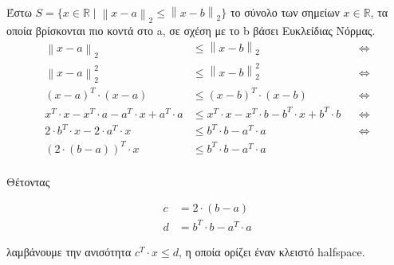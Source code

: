 \documentclass[12pt]{article}
\newcommand{\R}{\mathbb{R}}
\newcommand{\norm}[1]{\left\lVert#1\right\rVert}
\begin{document}
Έστω $S = \lbrace x \in \R \mid \norm{x - a}_2 \leq \norm{x - b}_2 \rbrace$ το σύνολο
των σημείων $x \in \R$, τα οποία βρίσκονται πιο κοντά στο a, σε σχέση με το b
βάσει Ευκλείδιας Νόρμας.\\

\begin{align*}
    \norm{x - a}_2 & \leq \norm{x - b}_2 && \Leftrightarrow \\
    \norm{x - a}_2^2 & \leq \norm{x - b}_2^2 && \Leftrightarrow \\
    (x - a)^T \cdot (x - a) & \leq (x - b)^T \cdot (x - b) && \Leftrightarrow \\
    x^T \cdot x - x^T \cdot a - a^T \cdot x + a^T \cdot a & \leq x^T \cdot x - x^T \cdot b - b^T \cdot x + b^T \cdot b && \Leftrightarrow \\
    2 \cdot b^T \cdot x - 2 \cdot a^T \cdot x & \leq b^T \cdot b - a^T \cdot a && \Leftrightarrow \\
    (2 \cdot (b - a))^T \cdot x & \leq b^T \cdot b - a^T \cdot a
\end{align*}\\

Θέτοντας

\begin{align*}
    c & = 2 \cdot (b - a) \\
    d & = b^T \cdot b - a^T \cdot a
\end{align*}

λαμβάνουμε την ανισότητα $c^T \cdot x \leq d$, η οποία ορίζει έναν κλειστό halfspace.
\end{document}
